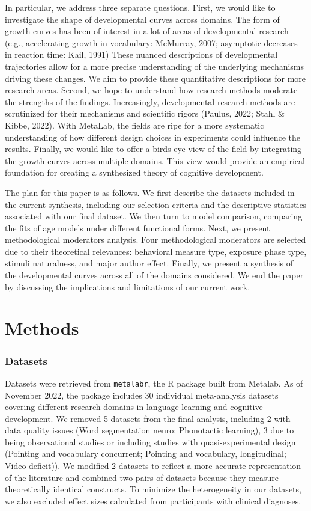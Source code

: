 \documentclass[10pt, letterpaper]{article}
\begin{document}
In particular, we address three separate questions. First, we would like
to investigate the shape of developmental curves across domains. The
form of growth curves has been of interest in a lot of areas of
developmental research (e.g., accelerating growth in vocabulary:
McMurray, 2007; asymptotic decreases in reaction time: Kail, 1991) These
nuanced descriptions of developmental trajectories allow for a more
precise understanding of the underlying mechanisms driving these
changes. We aim to provide these quantitative descriptions for more
research areas. Second, we hope to understand how research methods
moderate the strengths of the findings. Increasingly, developmental
research methods are scrutinized for their mechanisms and scientific
rigors (Paulus, 2022; Stahl \& Kibbe, 2022). With MetaLab, the fields
are ripe for a more systematic understanding of how different design
choices in experiments could influence the results. Finally, we would
like to offer a birds-eye view of the field by integrating the growth
curves across multiple domains. This view would provide an empirical
foundation for creating a synthesized theory of cognitive development.

The plan for this paper is as follows. We first describe the datasets
included in the current synthesis, including our selection criteria and
the descriptive statistics associated with our final dataset. We then
turn to model comparison, comparing the fits of age models under
different functional forms. Next, we present methodological moderators
analysis. Four methodological moderators are selected due to their
theoretical relevances: behavioral measure type, exposure phase type,
stimuli naturalness, and major author effect. Finally, we present a
synthesis of the developmental curves across all of the domains
considered. We end the paper by discussing the implications and
limitations of our current work.

\hypertarget{methods}{%
\section{Methods}\label{methods}}

\hypertarget{datasets}{%
\subsubsection{Datasets}\label{datasets}}

Datasets were retrieved from \texttt{metalabr}, the R package built from
Metalab. As of November 2022, the package includes 30 individual
meta-analysis datasets covering different research domains in language
learning and cognitive development. We removed 5 datasets from the final
analysis, including 2 with data quality issues (Word segmentation neuro;
Phonotactic learning), 3 due to being observational studies or including
studies with quasi-experimental design (Pointing and vocabulary
concurrent; Pointing and vocabulary, longitudinal; Video deficit)). We
modified 2 datasets to reflect a more accurate representation of the
literature and combined two pairs of datasets because they measure
theoretically identical constructs. To minimize the heterogeneity in our
datasets, we also excluded effect sizes calculated from participants
with clinical diagnoses.
\end{document}
